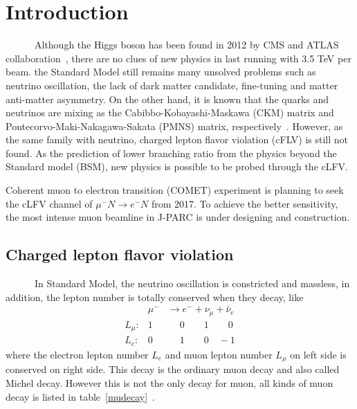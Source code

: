 \chapter{Introduction}
~~~~~~Although the Higgs boson has been found in 2012 by CMS and ATLAS collaboration~\cite{higgs}, there are no clues of new physics in last running with 3.5 TeV per beam.
the Standard Model still remains many unsolved problems such as neutrino oscillation, the lack of dark matter candidate, fine-tuning and matter anti-matter asymmetry.
On the other hand, it is known that the quarks and neutrinos are mixing as the Cabibbo-Kobayashi-Maskawa (CKM) matrix and Pontecorvo-Maki-Nakagawa-Sakata (PMNS) matrix, respectively~\cite{mark}.
However, as the same family with neutrino, charged lepton flavor violation (cFLV) is still not found.
As the prediction of lower branching ratio from the physics beyond the Standard model (BSM), new physics is possible to be probed through the cLFV.

Coherent muon to electron transition (COMET) experiment is planning to seek the cLFV channel of $\mu^- N \rightarrow e^- N$ from 2017.
To achieve the better sensitivity, the most intense muon beamline in J-PARC is under designing and construction.

\section{Charged lepton flavor violation}
~~~~~~In Standard Model, the neutrino oscillation is constricted and massless, in addition, the lepton number is totally conserved when they decay, like
\begin{eqnarray*}
 & \mu^- & \rightarrow  e^-  +  \nu_\mu  +  \bar \nu_e  \\
 L_\mu: & 1 & \quad\; 0 \qquad 1 \qquad\! 0 \\
 L_e: & 0 &   \quad\; 1 \qquad 0 \quad -1 
\end{eqnarray*}
where the electron lepton number $L_e$ and muon lepton number $L_\mu$ on left side is conserved on right side.
This decay is the ordinary muon decay and also called Michel decay.
However this is not the only decay for muon, all kinds of muon decay is listed in table~\ref{mudecay}~\cite{pdg}.

